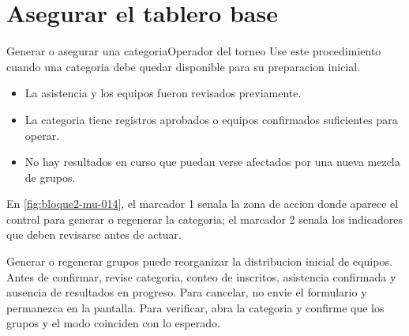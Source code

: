 \section{Asegurar el tablero base}


\begin{procedimiento}{Generar o asegurar una categoria}{Operador del torneo}
Use este procedimiento cuando una categoria debe quedar disponible para su preparacion inicial.
\end{procedimiento}

\begin{precondiciones}
\begin{itemize}
    \item La asistencia y los equipos fueron revisados previamente.
    \item La categoria tiene registros aprobados o equipos confirmados suficientes para operar.
    \item No hay resultados en curso que puedan verse afectados por una nueva mezcla de grupos.
\end{itemize}
\end{precondiciones}


En \cref{fig:bloque2-mu-014}, el marcador 1 senala la zona de accion donde aparece el control para generar o regenerar la categoria; el marcador 2 senala los indicadores que deben revisarse antes de actuar.

\begin{operacionsensible}
Generar o regenerar grupos puede reorganizar la distribucion inicial de equipos. Antes de confirmar, revise categoria, conteo de inscritos, asistencia confirmada y ausencia de resultados en progreso. Para cancelar, no envie el formulario y permanezca en la pantalla. Para verificar, abra la categoria y confirme que los grupos y el modo coinciden con lo esperado.
\end{operacionsensible}

